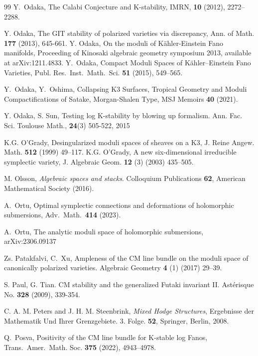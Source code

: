 \documentclass[12pt,twoside]{amsart}
\theoremstyle{definition}
\begin{document}
\begin{thebibliography}{99}
 Y.~Odaka, The Calabi Conjecture and K-stability, IMRN, {\bf10} (2012), 2272--2288.

 Y. Odaka, The GIT stability of polarized varieties via discrepancy, Ann. of Math. {\bf 177} (2013), 645-661. 
 Y. Odaka, On the moduli of K\"{a}hler-Einstein Fano manifolds, Proceeding of Kinosaki algebraic geometry symposium 2013, available at arXiv:1211.4833.
 Y.~Odaka, Compact Moduli Spaces of K\"ahler–Einstein Fano Varieties, Publ. Res.~Inst.~Math.~Sci. {\bf51} (2015), 549--565.

 Y.~Odaka, Y.~Oshima, Collapsing K3 Surfaces, Tropical Geometry and Moduli Compactifications of Satake, Morgan-Shalen Type, MSJ Memoirs {\bf40} (2021).


 Y. Odaka, S. Sun, Testing log K-stability by blowing up formalism. Ann. Fac. Sci. Toulouse Math., {\bf24}(3) 505-522, 2015

  K.G. O'Grady, Desingularized moduli spaces of sheaves on a K3, J. Reine Angew. Math. {\bf512} (1999) 49–117.
 K.G. O'Grady, A new six-dimensional irreducible symplectic variety, J. Algebraic Geom. {\bf12} (3) (2003) 435–505.


 M. Olsson, {\it Algebraic spaces and stacks}. Colloquium Publications {\bf62}, American Mathematical Society (2016).

 A.~Ortu, Optimal symplectic connections and deformations of holomorphic submersions, Adv.~Math.~{\bf414} (2023).

A.~Ortu,
The analytic moduli space of holomorphic submersions,
arXiv:2306.09137

 Zs. Patakfalvi, C.~Xu, Ampleness of the CM line bundle on the moduli space of canonically polarized varieties. Algebraic Geometry {\bf4} (1) (2017) 29--39.


 S. Paul, G. Tian. CM stability and the generalized Futaki invariant II. Ast\'{e}risque No. {\bf328} (2009), 339-354.




 C. A. M. Peters and J. H. M. Steenbrink, {\it Mixed Hodge Structures}, Ergebnisse der Mathematik Und
Ihrer Grenzgebiete. 3. Folge. {\bf52}, Springer, Berlin, 2008.

 Q.~Posva, Positivity of the CM line bundle for K-stable log Fanos, Trans.~Amer.~Math. Soc. {\bf375} (2022), 4943--4978.


\end{thebibliography}
\end{document}
